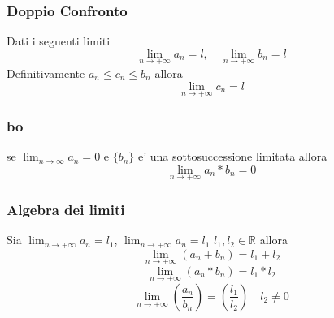 \documentclass{article}
\begin{document}
\begin{flushleft}
\begin{flushleft}
                \subsubsection{Doppio Confronto}
                \begin{flushleft}
                    Dati i seguenti limiti
                    \begin{equation}
                        \lim_{n\to+\infty} a_n = l,\quad  \lim_{n\to+\infty} b_n = l
                    \end{equation}
                    Definitivamente $a_n \leq c_n \leq b_n$ allora
                    \begin{equation}
                        \lim_{n\to+\infty} c_n=l
                    \end{equation}
                \end{flushleft}
                \subsubsection{bo}
                \begin{flushleft}
                    se $\lim_{n \to \infty} a_n =0 $ e $\{ b_n \}$ e' una sottosuccessione limitata allora
                    \begin{equation}
                        \lim_{n\to+\infty} a_n * b_n =0
                    \end{equation}
                \end{flushleft}
                \subsubsection{Algebra dei limiti}
                \begin{flushleft}
                    Sia $\lim_{n\to+\infty} a_n = l_1$, $\lim_{n\to+\infty} a_n = l_1$ $l_1,l_2 \in \mathbb{R}$ allora
                    \begin{equation}
                        \lim_{n\to+\infty} (a_n + b_n)=l_1+l_2
                    \end{equation}
                    \begin{equation}
                        \lim_{n\to+\infty} (a_n * b_n)=l_1*l_2
                    \end{equation}
                    \begin{equation}
                        \lim_{n\to+\infty} (\frac{a_n}{b_n})=(\frac{l_1}{l_2}) \quad l_2 \neq 0
                    \end{equation}
                \end{flushleft}

\end{flushleft}
\end{flushleft}
\end{document}
